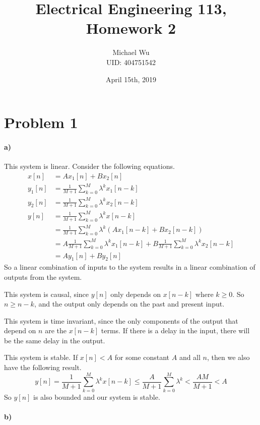 \documentclass[12pt]{article}
\begin{document}
\title{Electrical Engineering 113, Homework 2}
\date{April 15th, 2019}
\author{Michael Wu\\UID: 404751542}
\maketitle

\newcommand*{\underuparrow}[1]{\underset{\uparrow}{#1}}

\section*{Problem 1}

\paragraph{a)}

This system is linear. Consider the following equations.
\begin{align*}
    x[n] &= Ax_1[n]+Bx_2[n]\\
    y_1[n] &=\frac{1}{M+1}\sum_{k=0}^M\lambda^kx_1[n-k]\\
    y_2[n] &=\frac{1}{M+1}\sum_{k=0}^M\lambda^kx_2[n-k]\\
    y[n]&=\frac{1}{M+1}\sum_{k=0}^M\lambda^kx[n-k]\\
    &=\frac{1}{M+1}\sum_{k=0}^M\lambda^k(Ax_1[n-k]+Bx_2[n-k])\\
    &=A\frac{1}{M+1}\sum_{k=0}^M\lambda^kx_1[n-k]+B\frac{1}{M+1}\sum_{k=0}^M\lambda^kx_2[n-k]\\
    &=Ay_1[n]+By_2[n]
\end{align*}
So a linear combination of inputs to the system results in a linear combination of outputs from the system.

This system is causal, since \(y[n]\) only depends on \(x[n-k]\) where \(k\geq0\). So \(n\geq n-k\), and
the output only depends on the past and present input.

This system is time invariant, since the only components of the output that depend on \(n\) are the \(x[n-k]\)
terms. If there is a delay in the input, there will be the same delay in the output.

This system is stable. If \(x[n]<A\) for some constant \(A\) and all \(n\), then we also have the following result.
\[y[n]=\frac{1}{M+1}\sum_{k=0}^M\lambda^kx[n-k]\leq\frac{A}{M+1}\sum_{k=0}^M\lambda^k<\frac{AM}{M+1}<A\]
So \(y[n]\) is also bounded and our system is stable.

\paragraph{b)}
\end{document}
